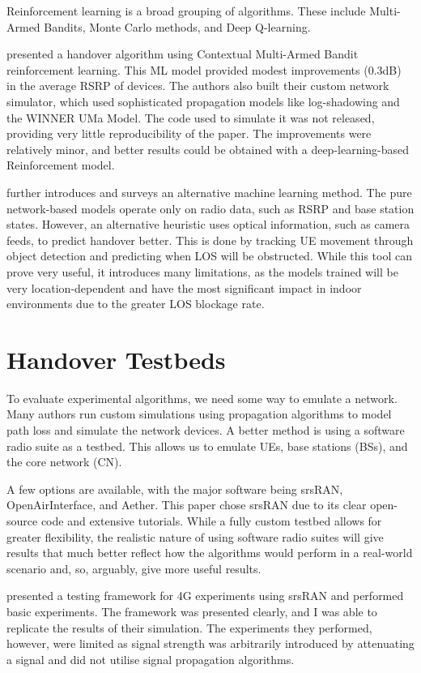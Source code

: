 Reinforcement learning is a broad grouping of algorithms. These include Multi-Armed Bandits, Monte Carlo methods, and Deep Q-learning.

\citet{yajnanarayana_5g_2020} presented a handover algorithm using Contextual Multi-Armed Bandit reinforcement learning. This ML model provided modest improvements (0.3dB) in the average RSRP of devices. The authors also built their custom network simulator, which used sophisticated propagation models like log-shadowing and the WINNER UMa Model. The code used to simulate it was not released, providing very little reproducibility of the paper. The improvements were relatively minor, and better results could be obtained with a deep-learning-based Reinforcement model.

\citet{mollel_survey_2021} further introduces and surveys an alternative machine learning method. The pure network-based models operate only on radio data, such as RSRP and base station states. However, an alternative heuristic uses optical information, such as camera feeds, to predict handover better. This is done by tracking UE movement through object detection and predicting when LOS will be obstructed. While this tool can prove very useful, it introduces many limitations, as the models trained will be very location-dependent and have the most significant impact in indoor environments due to the greater LOS blockage rate.

\section{Handover Testbeds}
To evaluate experimental algorithms, we need some way to emulate a network. Many authors run custom simulations using propagation algorithms to model path loss and simulate the network devices. A better method is using a software radio suite as a testbed. This allows us to emulate UEs, base stations (BSs), and the core network (CN).

A few options are available, with the major software being srsRAN, OpenAirInterface, and Aether. This paper chose srsRAN due to its clear open-source code and extensive tutorials. While a fully custom testbed allows for greater flexibility, the realistic nature of using software radio suites will give results that much better reflect how the algorithms would perform in a real-world scenario and, so, arguably, give more useful results.

\citet{powell_handover_2021} presented a testing framework for 4G experiments using srsRAN and performed basic experiments. The framework was presented clearly, and I was able to replicate the results of their simulation. The experiments they performed, however, were limited as signal strength was arbitrarily introduced by attenuating a signal and did not utilise signal propagation algorithms.

